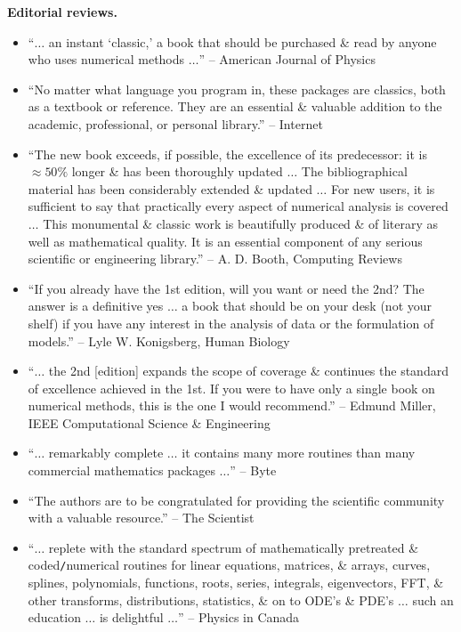 \documentclass{article}
\begin{document}
\begin{enumerate}
	{\bf Editorial reviews.}
	\begin{itemize}
		\item ``$\ldots$ an instant `classic,' a book that should be purchased \& read by anyone who uses numerical methods $\ldots$'' -- American Journal of Physics
		\item ``No matter what language you program in, these packages are classics, both as a textbook or reference. They are an essential \& valuable addition to the academic, professional, or personal library.'' -- Internet
		\item ``The new book exceeds, if possible, the excellence of its predecessor: it is $\approx50\%$ longer \& has been thoroughly updated $\ldots$ The bibliographical material has been considerably extended \& updated $\ldots$ For new users, it is sufficient to say that practically every aspect of numerical analysis is covered $\ldots$ This monumental \& classic work is beautifully produced \& of literary as well as mathematical quality. It is an essential component of any serious scientific or engineering library.'' -- {\sc A. D. Booth}, Computing Reviews
		\item ``If you already have the 1st edition, will you want or need the 2nd? The answer is a definitive yes $\ldots$ a book that should be on your desk (not your shelf) if you have any interest in the analysis of data or the formulation of models.'' -- {\sc Lyle W. Konigsberg}, Human Biology
		\item ``$\ldots$ the 2nd [edition] expands the scope of coverage \& continues the standard of excellence achieved in the 1st. If you were to have only a single book on numerical methods, this is the one I would recommend.'' -- {\sc Edmund Miller}, IEEE Computational Science \& Engineering
		\item ``$\ldots$ remarkably complete $\ldots$ it contains many more routines than many commercial mathematics packages $\ldots$'' -- Byte
		\item ``The authors are to be congratulated for providing the scientific community with a valuable resource.'' -- The Scientist
		\item ``$\ldots$ replete with the standard spectrum of mathematically pretreated \& coded{\tt/}numerical routines for linear equations, matrices, \& arrays, curves, splines, polynomials, functions, roots, series, integrals, eigenvectors, FFT, \& other transforms, distributions, statistics, \& on to ODE's \& PDE's $\ldots$ such an education $\ldots$ is delightful $\ldots$'' -- Physics in Canada
	\end{itemize}
	

\end{enumerate}
\end{document}
